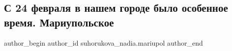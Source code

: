  
 
 
 
 
 
\subsection{С 24 февраля в нашем городе было особенное время. Мариупольское}
\label{sec:28_05_2022.fb.suhorukova_nadia.mariupol.1.vremja_gorod}
 
\ifcmt
 author_begin
   author_id suhorukova_nadia.mariupol
 author_end
\fi

